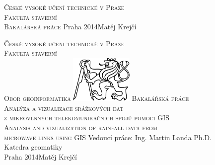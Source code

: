 \begin{center}
\newcommand{\napisCVUT}{České vysoké učení technické v Praze}
\newcommand{\napisFS}{Fakulta stavební}
\newcommand{\napisObor}{Obor geoinformatika}
\newcommand{\napisKatedra}{Katedra geomatiky}
\newcommand{\napisVedouci}{Ing. Martin Landa Ph.D.}
\newcommand{\napisAutor}{Matěj Krejčí}
\newcommand{\napisDatum}{Praha 2014}
\newcommand{\napisNazevI}{Analýza a vizualizace srážkových dat }
\newcommand{\napisNazevII}{z mikrovlnných telekomunikačních spojů pomocí GIS}
\newcommand{\napisNazevAjI}{Analysis and vizualization of rainfall data from}
\newcommand{\napisNazevAjII}{microwave links using GIS}
\newcommand{\napisBakalarka}{Bakalářská práce}
\newcommand{\napisPraha}{Praha 2014}
%
\newcommand{\velka}[1]{\textsc{#1}}
%
% 
\newif\ifpatitul
\patitultrue

\ifpatitul
{\Large\velka{\napisCVUT}}\\
\velka{\Large\napisFS}\\
\vfill
{\LARGE\velka{\napisBakalarka}}
\vfill
{\large\napisPraha\hfill\napisAutor}
\newpage
\fi%


{\Large\velka{\napisCVUT}}\\
{\Large\velka{\napisFS}}\\
{\Large\velka{\napisObor}}
\vfill
\includegraphics[width=3cm]{logo_cvut_cb} %
\vfill
{\Large\velka{\napisBakalarka}}\\
{\Large\velka{\napisNazevI\\
\napisNazevII}}\\
{\large\velka{\napisNazevAjI\\
\napisNazevAjII}}
\vfill
{\large%
Vedoucí práce: \napisVedouci\\
\napisKatedra\\
\bigskip
\napisDatum\hfill\napisAutor}
\end{center}
